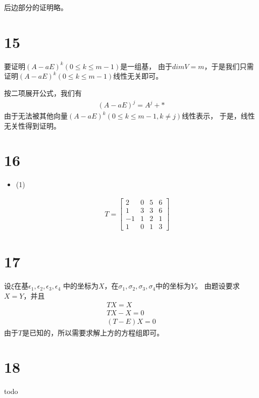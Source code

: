 \documentclass{article}
\begin{document}
后边部分的证明略。

\section*{15}

要证明$(A - aE)^k (0 \leq k \leq m - 1)$是一组基，
由于$dim V = m$，于是我们只需证明$(A - aE)^k (0 \leq k \leq m - 1)$线性无关即可。

按二项展开公式，我们有
\begin{align*}
  (A - aE)^j = A^j + *
\end{align*}
由于无法被其他向量$(A - aE)^k (0 \leq k \leq m - 1, k \neq j)$线性表示，
于是，线性无关性得到证明。

\section*{16}

\begin{itemize}
  \item (1)

        \begin{align*}
          T = \begin{bmatrix}
                2  & 0 & 5 & 6 \\
                1  & 3 & 3 & 6 \\
                -1 & 1 & 2 & 1 \\
                1  & 0 & 1 & 3
              \end{bmatrix}
        \end{align*}
\end{itemize}

\section*{17}

设$\xi$在基$\epsilon_1, \epsilon_2, \epsilon_3, \epsilon_4$
中的坐标为$X$，在$\sigma_1, \sigma_2, \sigma_3, \sigma_4$中的坐标为$Y$。
由题设要求$X = Y$，并且
\begin{align*}
  T X = X    \\
  TX - X = 0 \\
  (T - E) X = 0
\end{align*}
由于$T$是已知的，所以需要求解上方的方程组即可。

\section*{18}
todo
\end{document}
